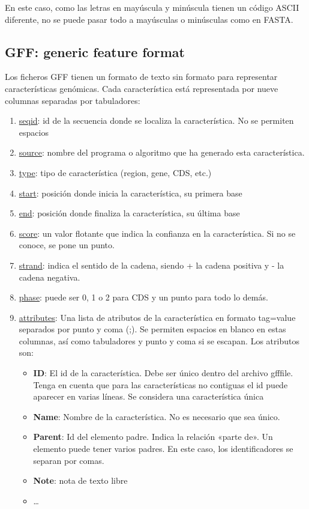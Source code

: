 En este caso, como las letras en mayúscula y minúscula tienen un código ASCII diferente, no se puede pasar todo a mayúsculas o minúsculas como en FASTA.

\subsection{GFF: generic feature format}
Los ficheros GFF tienen un formato de texto sin formato para representar características genómicas. Cada característica está representada por nueve columnas separadas por tabuladores:
\begin{enumerate}
\item \underline{seqid}: id de la secuencia donde se localiza la característica. No se permiten espacios
\item \underline{source}: nombre del programa o algoritmo que ha generado esta característica.
\item \underline{type}: tipo de característica (region, gene, CDS, etc.)
\item \underline{start}: posición donde inicia la característica, su primera base
\item \underline{end}: posición donde finaliza la característica, su última base
\item \underline{score}: un valor flotante que indica la confianza en la característica. Si no se conoce, se pone un punto.
\item \underline{strand}: indica el sentido de la cadena, siendo + la cadena positiva y - la cadena negativa.
\item \underline{phase}: puede ser 0, 1 o 2 para CDS y un punto para todo lo demás. 
\item \underline{attributes}: Una lista de atributos de la característica en formato tag=value separados por punto y coma (;). Se permiten espacios en blanco en estas columnas, así como tabuladores y punto y coma si se escapan. Los atributos son:
\begin{itemize}
\item \textbf{ID}: El id de la característica. Debe ser único dentro del archivo gfffile. Tenga en cuenta que para las características no contiguas el id puede aparecer en varias líneas. Se considera una característica única
\item \textbf{Name}: Nombre de la característica. No es necesario que sea único.
\item \textbf{Parent}: Id del elemento padre. Indica la relación «parte de». Un elemento puede tener varios padres. En este caso, los identificadores se separan por comas.
\item \textbf{Note}: nota de texto libre
\item \ldots
\end{itemize}
\end{enumerate}

